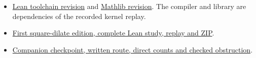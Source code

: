 \documentclass[12pt,letterpaper]{article}
\begin{document}
\begin{itemize}
\item \href{https://github.com/leanprover/lean4/commit/819816b2e0a3bf405af45ae5c7af2491d8f5bee6}{Lean toolchain revision} and \href{https://github.com/leanprover-community/mathlib4/commit/0df444a360eaa60ab8c11dca51a86af692955474}{Mathlib revision}. The compiler and library are dependencies of the recorded kernel replay.
\item \href{https://github.com/nousentllc/riemann-hypothesis/tree/17263859a4d27c62cfc67571737355f61a080806/research/uriel/experiments/ramified-square-dilates}{First square-dilate edition, complete Lean study, replay and ZIP}.
\item \href{https://github.com/nousentllc/riemann-hypothesis/tree/459a04431bbcc912c212b64fcc298b6a07774506/research/uriel/portfolio/ramified-companion}{Companion checkpoint, written route, direct counts and checked obstruction}.
\end{itemize}
\end{document}
